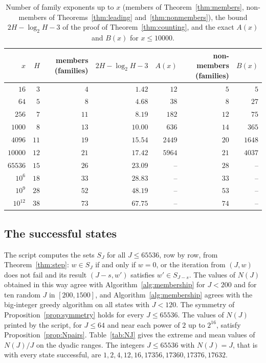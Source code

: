 \documentclass[11pt]{amsart}
\theoremstyle{definition}
\begin{document}
\begin{table}[H]
\centering
\caption{Number of family exponents up to $x$ (members of Theorem~\ref{thm:members}, non-members of Theorems~\ref{thm:leading} and~\ref{thm:nonmembers}), the bound $2H-\log_2H-3$ of the proof of Theorem~\ref{thm:counting}, and the exact $A(x)$ and $B(x)$ for $x\le10000$.}
\label{tab:bounds}
\begin{tabular}{rrrrrrr}
\toprule
$x$ & $H$ & members (families) & $2H-\log_2H-3$ & $A(x)$ & non-members (families) & $B(x)$\\
\midrule
$16$ & $3$ & $4$ & $1.42$ & $12$ & $5$ & $5$\\
$64$ & $5$ & $8$ & $4.68$ & $38$ & $8$ & $27$\\
$256$ & $7$ & $11$ & $8.19$ & $182$ & $12$ & $75$\\
$1000$ & $8$ & $13$ & $10.00$ & $636$ & $14$ & $365$\\
$4096$ & $11$ & $19$ & $15.54$ & $2449$ & $20$ & $1648$\\
$10000$ & $12$ & $21$ & $17.42$ & $5964$ & $21$ & $4037$\\
$65536$ & $15$ & $26$ & $23.09$ & -- & $28$ & --\\
$10^{6}$ & $18$ & $33$ & $28.83$ & -- & $33$ & --\\
$10^{9}$ & $28$ & $52$ & $48.19$ & -- & $53$ & --\\
$10^{12}$ & $38$ & $73$ & $67.75$ & -- & $74$ & --\\
\bottomrule
\end{tabular}
\end{table}

\subsection{The successful states}
\label{subsec:states-exp}
The script computes the sets $S_J$ for all $J\le65536$, row by row, from Theorem~\ref{thm:step}: $w\in S_J$ if and only if $w=0$, or the iteration from $(J,w)$ does not fail and its result $(J-s,w')$ satisfies $w'\in S_{J-s}$. The values of $N(J)$ obtained in this way agree with Algorithm~\ref{alg:membership} for $J<200$ and for ten random $J$ in $[200,1500]$, and Algorithm~\ref{alg:membership} agrees with the big-integer greedy algorithm on all states with $J<120$. The symmetry of Proposition~\ref{prop:symmetry} holds for every $J\le65536$. The values of $N(J)$ printed by the script, for $J\le64$ and near each power of $2$ up to $2^{16}$, satisfy Proposition~\ref{prop:Npairs}. Table~\ref{tab:NJ} gives the extreme and mean values of $N(J)/J$ on the dyadic ranges. The integers $J\le65536$ with $N(J)=J$, that is with every state successful, are $1,2,4,12,16,17356,17360,17376,17632$.
\end{document}
